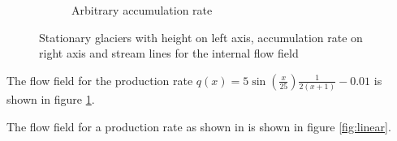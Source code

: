\begin{figure}[h]
\begin{subfigure}[b]{0.4\textwidth}
        \caption{Arbitrary accumulation rate}
        \label{fig:arbitrary}
    \end{subfigure}
    \caption{Stationary glaciers with height on left axis, accumulation rate on right axis and stream lines for the internal flow field}\label{fig:animals}
\end{figure}

The flow field for the production rate $q(x) = 5\sin(\frac{x}{25})\frac{1}{2(x + 1)} - 0.01$ is shown in figure \ref{fig:arbitrary}.

The flow field for a production rate as shown in  is shown in figure \ref{fig:linear}.
